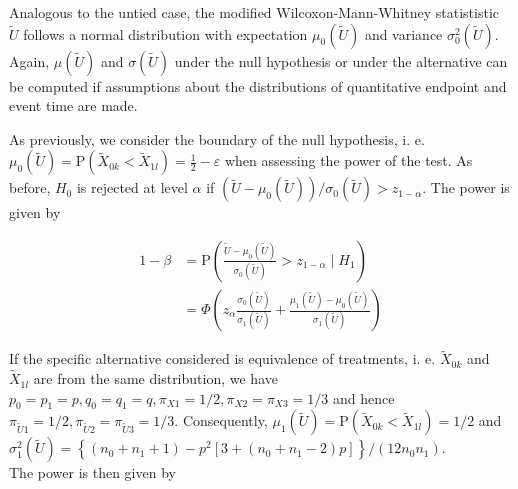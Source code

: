 \documentclass[bimj,fleqn]{w-art}\usepackage[]{graphicx}\usepackage[]{color}
\theoremstyle{plain}
\theoremstyle{definition}
\begin{document}
  Analogous to the untied case, the modified Wilcoxon-Mann-Whitney statististic
  $\widetilde{U}$ follows a normal distribution with expectation
  $\mu_0(\widetilde{U})$ and variance $\sigma^2_0(\widetilde{U})$.
  Again, $\mu(\widetilde{U})$ and $\sigma(\widetilde{U})$ under the null
  hypothesis or under the alternative can be computed if assumptions about the
  distributions of quantitative endpoint and event time are made.

  As previously, we consider the boundary of the null hypothesis, i. e.
  $\mu_0(\widetilde{U}) = \text{P}(\widetilde{X}_{0k} <
  \widetilde{X}_{1l}) = \frac{1}{2} - \varepsilon$ when assessing the power of
  the test. As before, $H_0$ is rejected at level $\alpha$ if
  $(\widetilde{U} - \mu_0(\widetilde{U})) / \sigma_0(\widetilde{U})
  > z_{1 - \alpha}$.
  The power is given by

  \begin{align*}
    1 - \beta &= \text{P} \left(\frac{\widetilde{U} - \mu_0(\widetilde{U})}{\sigma_0(\widetilde{U})}  >
                                   z_{1-\alpha} \mid H_1 \right) \\
              &= \Phi\left(z_{\alpha}\frac{\sigma_0(\widetilde{U})}{\sigma_1(\widetilde{U})} +
                              \frac{\mu_1(\widetilde{U}) - \mu_0(\widetilde{U})}{\sigma_1(\widetilde{U})} \right)
  \end{align*}

  If the specific alternative considered is equivalence of treatments, i. e.
  $\widetilde{X}_{0k}$ and $\widetilde{X}_{1l}$ are from the same distribution,
  we have $p_0 = p_1 = p, q_0 = q_1 = q, \pi_{X1} = 1/2,
  \pi_{X2} = \pi_{X3} = 1/3$ and hence
  $\pi_{\widetilde{U}1} = 1/2, \pi_{\widetilde{U}2} = \pi_{\widetilde{U}3} = 1/3 $.
  Consequently, $\mu_1(\widetilde{U}) = \text{P}(\widetilde{X}_{0k} < \widetilde{X}_{1l}) = 1/2$
  and \\
  $\sigma^2_1(\widetilde{U}) = \left\{ (n_0 + n_1 +1) -
                p^2 \left[ 3 +(n_0 + n_1 -2) p \right] \right\} / (12 n_0 n_1)$.\\
The power is then given by
\end{document}
